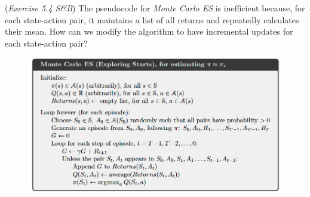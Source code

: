 (\textit{Exercise 5.4 S\&B}) The pseudocode for \textit{Monte Carlo ES} is 
inefficient because, for each state-action pair, it maintains a list of all 
returns and repeatedly calculates their mean. How can we modify the algorithm
to have incremental updates for each state-action pair?
\begin{figure}[h!]
  \center
\includegraphics[width=0.8\linewidth]{figures/mc_es_pseudocode.png}
\end{figure}